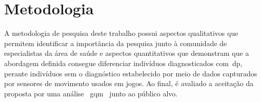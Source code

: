 
\section{Metodologia}
A metodologia de pesquisa deste trabalho possui aspectos qualitativos que permitem identificar a importância da pesquisa junto à comunidade de especialistas da área de saúde e aspectos quantitativos que demonstram que a abordagem definida consegue diferenciar indivíduos diagnosticados com~\ac{dp}, perante indivíduos sem o diagnóstico estabelecido por meio de dados capturados por sensores de movimento usados em jogos. Ao final, é avaliado a aceitação da proposta por uma análise ~\ac{gqm}~\cite{van1999goal} junto ao público alvo. %

